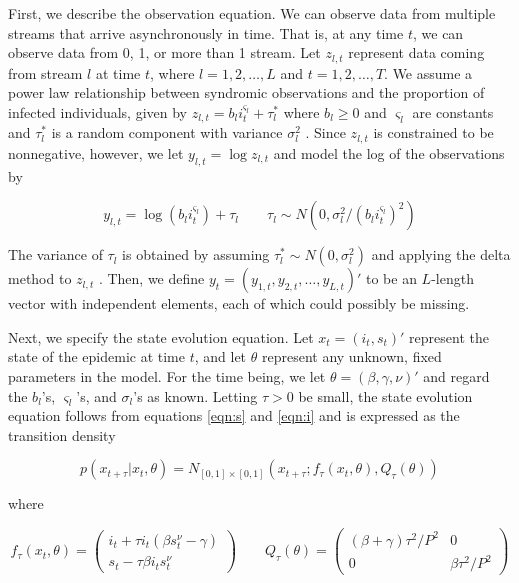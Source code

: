 \documentclass{elsarticle}
\begin{document}
First, we describe the observation equation.  We can observe data from multiple streams that arrive asynchronously in time.  That is, at any time $t$, we can observe data from 0, 1, or more than 1 stream.  Let $z_{l,t}$ represent data coming from stream $l$ at time $t$, where $l = 1,2,\ldots,L$ and $t = 1,2,\ldots,T$.  We assume a power law relationship between syndromic observations and the proportion of infected individuals, given by $z_{l,t} = b_li_t^{\varsigma_l} + \tau^*_l$ where $b_l \ge 0$ and $\varsigma_l$ are constants and $\tau^*_l$ is a random component with variance $\sigma_l^2$ \citep{Gins:Mohe:Pate:Bram:Smol:Bril:dete:2009}.  Since $z_{l,t}$ is constrained to be nonnegative, however, we let $y_{l,t} = \log z_{l,t}$ and model the log of the observations by

\begin{equation}
y_{l,t} = \log \left(b_li_t^{\varsigma_l}\right) + \tau_l \qquad \tau_l \sim N\left(0,\sigma_l^2 / (b_li_t^{\varsigma_l})^2\right) \label{eqn:obs}
\end{equation}

\noindent The variance of $\tau_l$ is obtained by assuming $\tau^*_l \sim N(0,\sigma_l^2)$ and applying the delta method to $z_{l,t}$ \citep[chap. 5]{Case:Berg:stat:2002}.  Then, we define $y_t = (y_{1,t},y_{2,t},\ldots,y_{L,t})'$ to be an $L$-length vector with independent elements, each of which could possibly be missing.

Next, we specify the state evolution equation.  Let $x_t = (i_t,s_t)'$ represent the state of the epidemic at time $t$, and let $\theta$ represent any unknown, fixed parameters in the model.  For the time being, we let $\theta = (\beta, \gamma, \nu)'$ and regard the $b_l$'s, $\varsigma_l$'s, and $\sigma_l$'s as known.  Letting $\tau > 0$ be small, the state evolution equation follows from equations \eqref{eqn:s} and \eqref{eqn:i} and is expressed as the transition density

\begin{equation}
p\left(x_{t+\tau}\left|x_t,\theta\right.\right) = N_{[0,1]\times[0,1]}\left(x_{t+\tau};f_\tau(x_t,\theta),Q_{\tau}(\theta)\right) \label{eqn:state}
\end{equation}

\noindent where

\[
f_\tau(x_t,\theta) = \left(
\begin{array}{c}
i_t + \tau i_t(\beta s^{\nu}_t - \gamma) \\
s_t - \tau\beta i_ts^{\nu}_t
\end{array}
\right)
\qquad
Q_\tau(\theta) = \left(
\begin{array}{ccccc}
(\beta + \gamma)\tau^2/P^2 & 0 \\
0 & \beta\tau^2/P^2
\end{array}
\right)
\]
\end{document}
